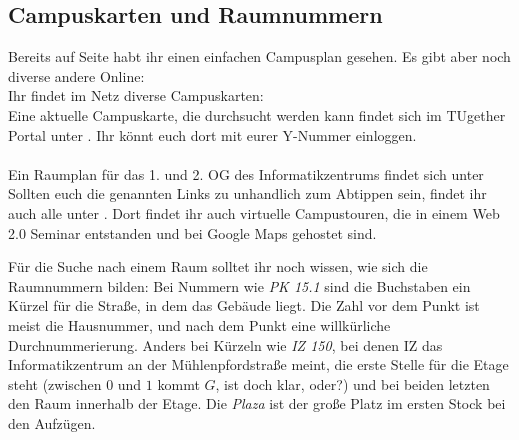\subsection{Campuskarten und Raumnummern}
\label{campuskarte}
\ifpdf %
Bereits auf Seite \pageref{plan} habt ihr einen einfachen Campusplan
gesehen. Es gibt aber noch diverse andere Online:\\
\else
Ihr findet im Netz diverse Campuskarten:\\
\fi
Eine aktuelle Campuskarte, die durchsucht werden kann findet sich im
TUgether Portal unter . Ihr
könnt euch dort mit eurer Y-Nummer einloggen.\\\\

Ein Raumplan für das 1. und 2. OG des Informatikzentrums findet sich
unter\\ 
Sollten euch die genannten Links zu unhandlich zum Abtippen sein, findet ihr
auch alle unter
.
Dort findet ihr auch virtuelle Campustouren, die  in einem Web 2.0 Seminar entstanden und
bei Google Maps gehostet sind.

Für die Suche nach einem Raum solltet ihr noch wissen, wie sich die Raumnummern bilden: Bei Nummern wie \textit{PK 15.1} sind die Buchstaben ein Kürzel für die Straße, in dem das Gebäude liegt. Die Zahl vor dem Punkt ist meist die Hausnummer, und nach dem Punkt eine willkürliche Durchnummerierung. Anders bei Kürzeln wie \textit{IZ 150}, bei denen IZ das Informatikzentrum an der Mühlenpfordstraße meint, die erste Stelle für die Etage steht (zwischen $0$ und $1$ kommt $G$, ist doch klar, oder?) und bei beiden letzten den Raum innerhalb der Etage. Die \textit{Plaza} ist der große Platz im ersten Stock bei den Aufzügen.

